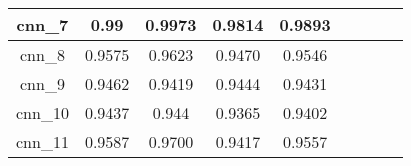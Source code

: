 \begin{table}[p]
\begin{tabular} {|c|c|c|c|c|c|c|c|c| }
        cnn\_7   & \cellcolor{green!50}0.99     & 0.9973                     & 0.9814                     & 0.9893                     \\ \hline
        cnn\_8   & 0.9575                       & 0.9623                     & 0.9470                     & 0.9546                     \\ \hline
        cnn\_9   & 0.9462                       & 0.9419                     & 0.9444                     & 0.9431                     \\ \hline
        cnn\_10  & 0.9437                       & 0.944                      & 0.9365                     & 0.9402                     \\ \hline
        cnn\_11  & 0.9587                       & 0.9700                     & 0.9417                     & 0.9557                     \\ \hline
    \end{tabular}
\end{table}


